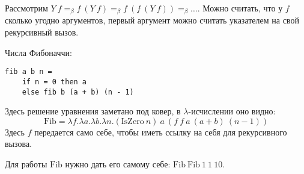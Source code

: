 Рассмотрим \(Y\ f =_\beta f\ (Y\ f) =_\beta f\ (f\ (Y\ f)) =_\beta \dots \). Можно считать, что у \(f\) сколько угодно аргументов, первый аргумент можно считать указателем на свой рекурсивный вызов.

\begin{example}
    Числа Фибоначчи:
    \begin{verbatim}
fib a b n =
    if n = 0 then a
    else fib b (a + b) (n - 1)
    \end{verbatim}

    Здесь решение уравнения заметано под ковер, в \(\lambda\)-исчислении оно видно:
    \[\mathrm{Fib} = \lambda f.\lambda a.\lambda b.\lambda n.(\mathrm{IsZero}\ n)\ a\ (f\ f\ a\ (a + b)\ (n - 1))\]
    Здесь \(f\) передается само себе, чтобы иметь ссылку на себя для рекурсивного вызова.

    Для работы \(\mathrm{Fib}\) нужно дать его самому себе: \(\mathrm{Fib}\ \mathrm{Fib}\ 1\ 1\ 10\).
\end{example}
